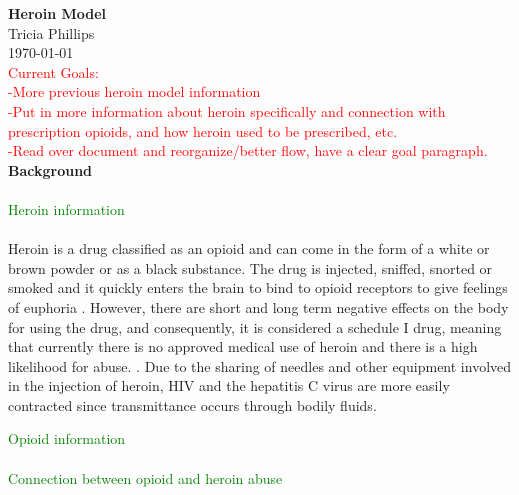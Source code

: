 \documentclass[12pt]{article}
\begin{document}
\textbf{Heroin Model} \\
Tricia Phillips \\
\today \\

\textcolor{red}{Current Goals:} \\ 
\textcolor{red}{-More previous heroin model information} \\ 
\textcolor{red}{-Put in more information about heroin specifically and connection with prescription opioids, and how heroin used to be prescribed, etc.} \\ 
\textcolor{red} {-Read over document and reorganize/better flow, have a clear goal paragraph.} \\ 

\textbf{Background} \\ \\


\textcolor{green}{Heroin information} \\ \\

Heroin is a drug classified as an opioid and can come in the form of a white or brown powder or as a black substance. The drug is injected, sniffed, snorted or smoked and it quickly enters the brain to bind to opioid receptors to give feelings of euphoria \cite{NIH1}. However, there are short and long term negative effects on the body for using the drug, and consequently, it is considered a schedule I drug, meaning that currently there is no approved medical use of heroin and there is a high likelihood for abuse. \cite{DEA1, NIH1}. Due to the sharing of needles and other equipment involved in the injection of heroin, HIV and the hepatitis C virus are more easily contracted since transmittance occurs through bodily fluids. 



\textcolor{green}{Opioid information} \\ \\

\textcolor{green}{Connection between opioid and heroin abuse} \\ \\
\end{document}
